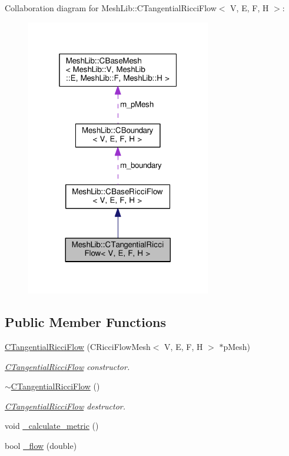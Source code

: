 Collaboration diagram for Mesh\+Lib\+:\+:C\+Tangential\+Ricci\+Flow$<$ V, E, F, H $>$\+:
\nopagebreak
\begin{figure}[H]
\begin{center}
\leavevmode
\includegraphics[width=229pt]{class_mesh_lib_1_1_c_tangential_ricci_flow__coll__graph}
\end{center}
\end{figure}
\subsection*{Public Member Functions}
\begin{DoxyCompactItemize}
\item 
\hyperlink{class_mesh_lib_1_1_c_tangential_ricci_flow_acf2f58bd7f00038259518d7fa1e4dfbf}{C\+Tangential\+Ricci\+Flow} (C\+Ricci\+Flow\+Mesh$<$ V, E, F, H $>$ $\ast$p\+Mesh)
\begin{DoxyCompactList}\small\item\em \hyperlink{class_mesh_lib_1_1_c_tangential_ricci_flow}{C\+Tangential\+Ricci\+Flow} constructor. \end{DoxyCompactList}\item 
\hyperlink{class_mesh_lib_1_1_c_tangential_ricci_flow_a4e7d0a53f0f06e93ae7af4da5d23aeec}{$\sim$\+C\+Tangential\+Ricci\+Flow} ()
\begin{DoxyCompactList}\small\item\em \hyperlink{class_mesh_lib_1_1_c_tangential_ricci_flow}{C\+Tangential\+Ricci\+Flow} destructor. \end{DoxyCompactList}\item 
void \hyperlink{class_mesh_lib_1_1_c_tangential_ricci_flow_a14983a8b8819f1b37a88bed0db5d1e4a}{\+\_\+calculate\+\_\+metric} ()
\item 
bool \hyperlink{class_mesh_lib_1_1_c_tangential_ricci_flow_a5ab0113d3d85597f6a782d8ca972bad7}{\+\_\+flow} (double)
\end{DoxyCompactItemize}
